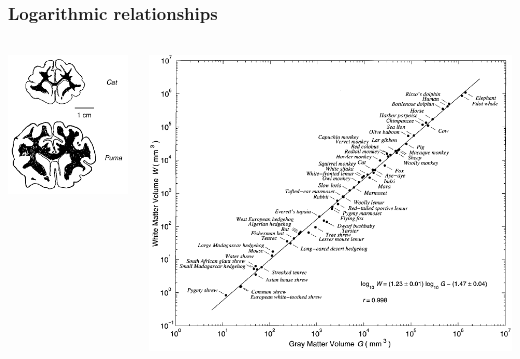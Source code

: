 
\begin{frame}
\frametitle{Logarithmic relationships}
\begin{columns}[c]
\includegraphics[width=\textwidth]{zhang_sejnowski1}\par
{}
\includegraphics[width=\textwidth]{zhang_sejnowski}\par

\end{columns}
\end{frame}
